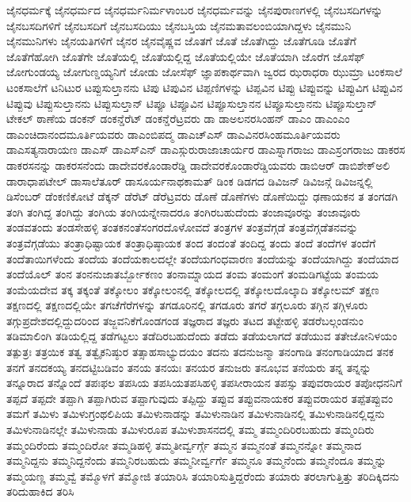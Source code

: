 {ಜೈನಧರ್ಮಕ್ಕೆ
ಜೈನಧರ್ಮದ
ಜೈನಧರ್ಮನಿರ್ಮಳಾಂಬರ
ಜೈನಧರ್ಮವನ್ನು
ಜೈನಪುರಾಣಗಳಲ್ಲಿ
ಜೈನಬಸದಿಗಳನ್ನು
ಜೈನಬಸದಿಗಳಿಗೆ
ಜೈನಬಸದಿಗೆ
ಜೈನಬಸದಿಯು
ಜೈನಬಸ್ತಿಯ
ಜೈನಮತಾವಲಂಬಿಯಾಗಿದ್ದಳು
ಜೈನಮುನಿ
ಜೈನಮುನಿಗಳು
ಜೈನಯತಿಗಳಿಗೆ
ಜೈನರ
ಜೈನವೈಷ್ಣವ
ಜೊತಗೆ
ಜೊತೆ
ಜೊತೆಗಿದ್ದು
ಜೊತೆಗೂಡಿ
ಜೊತೆಗೆ
ಜೊತೆಗೆಹೋಗಿ
ಜೊತೆಗೇ
ಜೊತೆಯಲ್ಲಿ
ಜೊತೆಯಲ್ಲಿದ್ದ
ಜೊತೆಯಲ್ಲಿಯೇ
ಜೊತೆಯಾಗಿ
ಜೊರೆಗ
ಜೊಸೆಫ್
ಜೋಗುಂಡಯ್ಯ
ಜೋಗುಣ್ಡಯ್ಯನಿಗೆ
ಜೋಡು
ಜೋಸೆಫ್
ಜ್ಞಾಪಕಾರ್ಥವಾಗಿ
ಜ್ವರದ
ಝರಾಧರಾ
ಝುಮ್ರಾ
ಟಂಕಸಾಲೆ
ಟಂಕಸಾಲೆಗೆ
ಟನಿಟುರ
ಟಪ್ಪುಸುಲ್ತಾನನು
ಟಿಪು
ಟಿಪುವಿನ
ಟಿಪ್ಪಣಿಗಳನ್ನು
ಟಿಪ್ಪವಿನ
ಟಿಪ್ಪು
ಟಿಪ್ಪುವನ್ನು
ಟಿಪ್ಪುವಿಗ
ಟಿಪ್ಪುವಿನ
ಟಿಪ್ಪುವು
ಟಿಪ್ಪುಸುಲ್ತಾನನು
ಟಿಪ್ಪುಸುಲ್ತಾನ್
ಟಿಪ್ಪೂ
ಟಿಪ್ಪೂವಿನ
ಟಿಪ್ಪೂಸುಲ್ತಾನನ
ಟಿಪ್ಪೂಸುಲ್ತಾನನು
ಟಿಪ್ಪೂಸುಲ್ತಾನ್
ಟೇಕಲ್
ಠಾಣೆಯ
ಡಂಕನ್
ಡಂಕನ್ಡೆರೆಟ್
ಡಂಕನ್ಡೆರೆಟ್ರವರು
ಡಾ
ಡಾಅಲನರಸಿಂಹನ್
ಡಾಎಂ
ಡಾಎಂಎಂ
ಡಾಎಂಚಿದಾನಂದಮೂರ್ತಿಯವರು
ಡಾಎಂಬಿಪದ್ಮ
ಡಾಎಚ್ಎಸ್
ಡಾಎವಿನರಸಿಂಹಮೂರ್ತಿಯವರು
ಡಾಎಸತ್ಯನಾರಾಯಣ
ಡಾಎಸ್
ಡಾಎಸ್ಎನ್
ಡಾಎಸ್ಗುರುರಾಜಾಚಾರ್ಯರ
ಡಾಎಸ್ನಾಗರಾಜು
ಡಾಎಸ್ರಂಗರಾಜು
ಡಾಕರಸ
ಡಾಕರಸನನ್ನು
ಡಾಕರಸನೆಂದು
ಡಾದೇವರಕೊಂಡಾರೆಡ್ಡಿ
ಡಾದೇವರಕೊಂಡಾರೆಡ್ಡಿಯವರು
ಡಾಬಿಆರ್
ಡಾಬಿಶೇಕ್ಅಲಿ
ಡಾರಾಧಾಪಟೇಲ್
ಡಾಸಾಲೆತೂರ್
ಡಾಸೂರ್ಯನಾಥಕಾಮತ್
ಡಿಂಕ
ಡಿಡಗದ
ಡಿವಿಜನ್
ಡಿವಿಜನ್ಗೆ
ಡಿವಿಜನ್ನಲ್ಲಿ
ಡಿಸೆಂಬರ್
ಡೆಂಕಣಿಕೋಟೆ
ಡೆಕ್ಕನ್
ಡೆರೆಟ್
ಡೆರೆಟ್ರವರು
ಡೊಣೆ
ಡೊಣೆಗಳು
ಡೊಣೆಯಿದ್ದು
ಢಣಾಯಕನ
ತ
ತಂಗಡಗಿ
ತಂಗಿ
ತಂಗಿದ್ದ
ತಂಗಿದ್ದು
ತಂಗಿಯ
ತಂಗಿಯನ್ನೇನಾದರೂ
ತಂಗಿರಬಹುದೆಂದು
ತಂಜಾವೂರನ್ನು
ತಂಜಾವೂರು
ತಂಡವತಂದು
ತಂಡಸೇಹಳ್ಳಿ
ತಂತಕನಂತೆಸಂಗರದೊಳೋವದೆ
ತಂತ್ರಗಳ
ತಂತ್ರವೆಗ್ಗಡೆ
ತಂತ್ರವೆಗ್ಗಡೆತನವನ್ನು
ತಂತ್ರವೆಗ್ಗಡೆಯು
ತಂತ್ರಾಧಿಷ್ಟಾಯಕ
ತಂತ್ರಾಧಿಷ್ಠಾಯಕ
ತಂದ
ತಂದಂತೆ
ತಂದಿದ್ದ
ತಂದು
ತಂದೆ
ತಂದೆಗಳ
ತಂದೆಗೆ
ತಂದೆತಾಯಿಗಳೆಂದು
ತಂದೆಯ
ತಂದೆಯಕಾಲದಲ್ಲೇ
ತಂದೆಯಗಂಧವಾರಣ
ತಂದೆಯನ್ನು
ತಂದೆಯಾಗಿದ್ದು
ತಂದೆಯಾದ
ತಂದೆಯೊಲ್
ತಂನ
ತಂನನುಜಾತರ್ಬ್ಬೋಕಣಂ
ತಂನಾಮ್ನಾಯದ
ತಂಮ
ತಂಮಂಗೆ
ತಂಮಡಿಗಟ್ಟೆಯ
ತಂಮಯ
ತಂಮೆಯದೇವ
ತಕ್ಕ
ತಕ್ಕಂತೆ
ತಕ್ಕೋಲಂ
ತಕ್ಕೋಲಂನಲ್ಲಿ
ತಕ್ಕೋಲದಲ್ಲಿ
ತಕ್ಕೋಲದೊಲ್ಕಾದಿ
ತಕ್ಕೋಲಮ್
ತಕ್ಷಣ
ತಕ್ಷಣದಲ್ಲಿ
ತಕ್ಷಣದಲ್ಲಿಯೇ
ತಗಚೆಗೆರೆಗಳನ್ನು
ತಗಡೂರಿನಲ್ಲಿ
ತಗಡೂರು
ತಗರೆ
ತಗ್ಗಲೂರು
ತಗ್ಗಿನ
ತಗ್ಗಿಳೂರು
ತಗ್ಗುಪ್ರದೇಶದಲ್ಲಿದ್ದುದರಿಂದ
ತಜ್ಜವನಿಕೆಗೊಂಡಗಂಡ
ತಜ್ಞರಾದ
ತಜ್ಞರು
ತಟದ
ತಟ್ಟೇಹಳ್ಳಿ
ತಡರೆಬಲ್ಗಂಡನುಂ
ತಡಿಮಾಲಿಂಗಿ
ತಡಿಯಲ್ಲಿದ್ದ
ತಡೆಗಟ್ಟಲು
ತಡೆದಿರಬಹುದೆಂದು
ತಡೆದು
ತಡೆಯಲಾಗದೆ
ತಡೆಯುವ
ತತೇಜೋನಿಳಯಂ
ತತ್ಪುತ್ರಃ
ತತ್ರಯಿಕ
ತತ್ವ
ತತ್ವೈಕನಿಷ್ಠುರ
ತತ್ಸಾಹಸಾಭ್ಯುದಯಂ
ತದನು
ತದನುಜನ್ಮಾ
ತನಂಗಾಡಿ
ತನಂಗಾಡಿಯಾದ
ತನಕ
ತನಗೆ
ತನದಕಯ್ಯ
ತನದಟ್ಟಿಬಡಿವಂ
ತನಯ
ತನಯಃ
ತನಯರ
ತನುಜರು
ತನೂಭವ
ತನೆಯರು
ತನ್ನ
ತನ್ನನ್ನು
ತನ್ನೂರಾದ
ತನ್ನೊಂದೆ
ತಪಃಫಲ
ತಪಸಿಯ
ತಪಸಿಯತಪಸಿಹಳ್ಳಿ
ತಪಸೀರಾಯನ
ತಪಸ್ಸು
ತಪುವರಾಯರ
ತಪೋಧನನಿಗೆ
ತಪ್ಪದೆ
ತಪ್ಪದೇ
ತಪ್ಪಾಗಿ
ತಪ್ಪಾಗಿರುವ
ತಪ್ಪಾಗುವುದು
ತಪ್ಪಿದ್ದು
ತಪ್ಪುವ
ತಪ್ಪುವನಾಯಕರ
ತಪ್ಪುವರಾಯರ
ತಪ್ಪೆತಪ್ಪುವಂ
ತಮಗೆ
ತಮಿಳು
ತಮಿಳುಗ್ರಂಥಲಿಪಿಯ
ತಮಿಳುನಾಡನ್ನು
ತಮಿಳುನಾಡಿನ
ತಮಿಳುನಾಡಿನಲ್ಲಿ
ತಮಿಳುನಾಡಿನಲ್ಲಿದ್ದನು
ತಮಿಳುನಾಡಿನಲ್ಲೇ
ತಮಿಳುನಾಡು
ತಮಿಳುರೂಪ
ತಮಿಳುಶಾಸನದಲ್ಲಿ
ತಮ್ಮ
ತಮ್ಮಂದಿರಿರಬಹುದು
ತಮ್ಮಂದಿರು
ತಮ್ಮಂದಿರೆಂದು
ತಮ್ಮಂದಿರೋ
ತಮ್ಮಡಿಹಳ್ಳಿ
ತಮ್ಮತೀರ್ವ್ವರ್ಗ್ಗೆ
ತಮ್ಮನ
ತಮ್ಮನಂತೆ
ತಮ್ಮನನ್ನೋ
ತಮ್ಮನಾದ
ತಮ್ಮನಿದ್ದನು
ತಮ್ಮನಿದ್ದನೆಂದು
ತಮ್ಮನಿರಬಹುದು
ತಮ್ಮನೀರ್ವ್ವರ್ಗೆ
ತಮ್ಮನೂ
ತಮ್ಮನೆಂದು
ತಮ್ಮನೆಂದೂ
ತಮ್ಮನ್ನು
ತಮ್ಮಯಣ್ಣ
ತಮ್ಮವ್ವೆ
ತಮ್ಮೊಳಗೆ
ತಮ್ಮೋಜಿ
ತಯಾರಿಸಿ
ತಯಾರಿಸುತ್ತಿದ್ದರೆಂದು
ತಯಾರು
ತರಲಾಗುತ್ತಿತ್ತು
ತರಿದಿಕ್ಕಿದನು
ತರಿದುಹಾಕಿದ
ತರಿಸಿ
}
